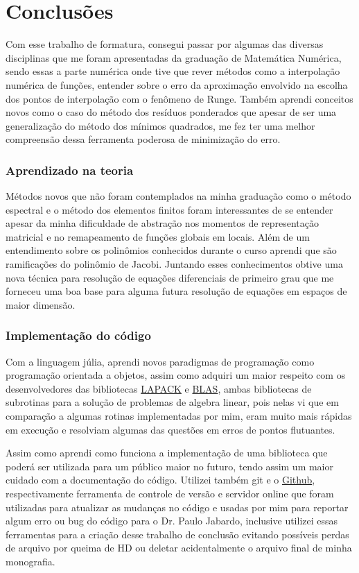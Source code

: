 \chapter{Conclusões}

 Com esse trabalho de formatura, consegui  passar por algumas das diversas disciplinas que me foram apresentadas da graduação de Matemática Numérica, sendo essas a parte numérica onde tive que rever métodos como a interpolação numérica de funções, entender sobre o erro da aproximação envolvido na escolha dos pontos de interpolação com o fenômeno de Runge. Também aprendi conceitos novos como o caso do método dos resíduos ponderados que apesar de ser uma generalização do método dos mínimos quadrados, me fez ter uma melhor compreensão dessa ferramenta poderosa de minimização do erro. 
 \subsection{Aprendizado na teoria}
 Métodos novos que não foram contemplados na minha graduação como o método espectral e o método dos elementos finitos foram interessantes de se entender apesar da minha dificuldade de abstração nos momentos de representação matricial e no remapeamento de funções globais em locais. Além de um entendimento sobre os polinômios conhecidos durante o curso aprendi que são ramificações do polinômio de Jacobi. Juntando esses conhecimentos obtive uma nova técnica para resolução de equações diferenciais de primeiro grau que me forneceu uma boa base para alguma futura resolução de equações em espaços de maior dimensão.

 \subsection{Implementação do código} 
 Com a linguagem júlia, aprendi novos paradigmas de programação como programação orientada a objetos, assim como adquiri um maior respeito com os desenvolvedores das bibliotecas \href{http://www.netlib.org/lapack/}{LAPACK} e \href{http://www.netlib.org/blas/}{BLAS}, ambas bibliotecas de subrotinas para a solução de problemas de algebra linear, pois nelas vi que em comparação a algumas rotinas implementadas por mim, eram muito mais rápidas em execução e resolviam algumas das questões em erros de pontos flutuantes. 
 
 Assim como aprendi como funciona a implementação de uma biblioteca que poderá ser utilizada para um público maior no futuro, tendo assim um maior cuidado com a documentação do código. Utilizei também  git e o \href{http://www.github.com/}{Github}, respectivamente ferramenta de controle de versão e servidor online que foram utilizadas para atualizar as mudanças no código e usadas por mim para reportar algum erro ou bug do código para o Dr. Paulo Jabardo, inclusive utilizei essas ferramentas para a criação desse trabalho de conclusão evitando possíveis perdas de arquivo por queima de HD ou deletar acidentalmente o arquivo final de minha monografia.


